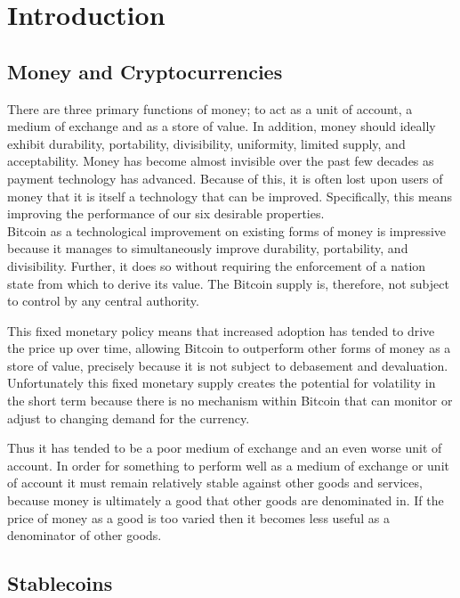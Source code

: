\section{Introduction}

\subsection{Money and Cryptocurrencies}

There are three primary functions of money; to act as a unit of account, a medium of exchange
and as a store of value. In addition, money should ideally exhibit durability,
portability, divisibility, uniformity, limited supply, and acceptability.
Money has become almost invisible over the past few decades as payment technology has advanced.
Because of this, it is often lost upon users of money that it is itself a technology that can be
improved. Specifically, this means improving the performance of our six desirable properties. \\

\noindent Bitcoin as a technological improvement on existing forms of money is impressive because it manages to
simultaneously improve durability, portability, and divisibility.
Further, it does so without requiring the enforcement of a nation state from which to derive its value.
The Bitcoin supply is, therefore, not subject to control by any central authority.

This fixed monetary policy means that increased adoption has tended to drive the price up over time,
allowing Bitcoin to outperform other forms of money as a store of value, precisely because it is not
subject to debasement and devaluation. Unfortunately this fixed monetary supply creates the potential
for volatility in the short term because there is no mechanism within Bitcoin that can monitor or
adjust to changing demand for the currency.

Thus it has tended to be a poor medium of exchange and an even worse unit of account.
In order for something to perform well as a medium of exchange or unit of account it must remain
relatively stable against other goods and services, because money is ultimately a good that other goods
are denominated in. If the price of money as a good is too varied then it becomes less useful as a
denominator of other goods. \\

\subsection{Stablecoins}

